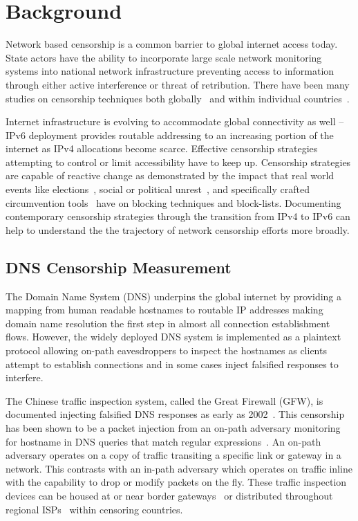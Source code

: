 \section{Background}\label{sec:background}


Network based censorship is a common barrier to global internet access today.
State actors have the ability to incorporate large scale network monitoring
systems into national network infrastructure preventing access to information
through either active interference or threat of retribution. There
have been many studies on censorship techniques both
globally~\cite{pearce2017global,niaki2020iclab,scott2016satellite,sundara2020censored,filasto2012ooni,pearce2017augur}
and within individual countries~\cite{USESEC21:GFWatch,aryan2013internet,ramesh2020decentralized,yadav2018light,gebhart2017internet,nabi2013anatomy}.

Internet infrastructure is evolving to accommodate global connectivity as well
-- IPv6 deployment provides routable addressing to an increasing portion of the
internet as IPv4 allocations become scarce. Effective censorship strategies
attempting to control or limit accessibility have to keep up.
Censorship strategies are capable of reactive change as demonstrated by
the impact that real world events like elections~\cite{aryan2013internet},
social or political unrest~\cite{shandler2018measuring,padmanabhan2021multi},
and specifically crafted circumvention tools~\cite{beznazwy2020china}
have on blocking techniques and block-lists. Documenting contemporary censorship
strategies through the transition from IPv4 to IPv6 can help to understand the
the trajectory of network censorship efforts more broadly.


\subsection{DNS Censorship Measurement}
The Domain Name System (DNS) underpins the global internet by providing a
mapping from human readable hostnames to routable IP addresses making domain name
resolution the first step in almost all connection establishment flows. However,
the widely deployed DNS system is implemented as a plaintext protocol allowing
on-path eavesdroppers to inspect the hostnames as clients attempt to establish
connections and in some cases inject falsified responses to interfere.

The Chinese traffic inspection system, called the Great Firewall (GFW),
is documented injecting falsified DNS responses as early as 2002~\cite{global2002great}.
This censorship has been shown to be a packet injection from an on-path adversary
monitoring for hostname in DNS queries that match regular
expressions~\cite{USESEC21:GFWatch}. An on-path adversary
operates on a copy of traffic transiting a specific link or gateway in a network.
This contrasts with an in-path adversary which operates on traffic inline with
the capability to drop or modify packets on the fly. These traffic inspection
devices can be housed at or near border gateways~\cite{xu2011internet} or
distributed throughout regional ISPs~\cite{ramesh2020decentralized} within
censoring countries.

